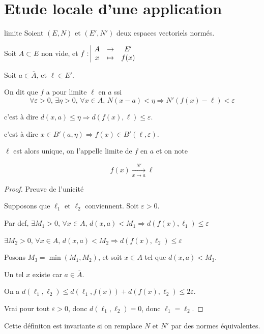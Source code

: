 \section{Etude locale d'une application}

\begin{definition}{limite}{}
    Soient $(E, N)$ et $(E', N')$ deux espaces vectoriels normés. 

    Soit $A \subset E$ non vide, et $f: \space \begin{array}{|ccc} \displaystyle A & \to & \displaystyle E' \\ \displaystyle x & \mapsto & \displaystyle f(x) \end{array}$

    Soit $a \in \overline A$, et $\ell \in E'$.

    On dit que $f$ a pour limite $\ell$ en $a$ ssi 
    $$\forall \varepsilon > 0, \, \exists \eta > 0, \, \forall x \in A, \, N(x - a) < \eta \Rightarrow N'(f(x) - \ell) < \varepsilon$$

    c'est à dire $d(x, a) \leqslant \eta \Rightarrow d(f(x), \ell) \leqslant \varepsilon$.

    c'est à dire $x \in B'(a, \eta) \Rightarrow f(x) \in B'(\ell, \varepsilon)$.

    $\ell$ est alors unique, on l'appelle limite de $f$ en $a$ et on note 

    $$f(x) \xrightarrow[x \to a ]{N'} \ell$$

\end{definition}


\begin{proof}
    Preuve de l'unicité 

    Supposons que $\ell_1$ et $\ell_2$ conviennent. Soit $\varepsilon > 0$.

    Par def, $\exists M_1 > 0, \, \forall x \in A, \, d(x, a) < M_1  \Rightarrow d(f(x), \ell_1) \leqslant \varepsilon$

    $\exists M_2 > 0, \, \forall x \in A, \, d(x, a) < M_2  \Rightarrow d(f(x), \ell_2) \leqslant \varepsilon$

    Posons $M_3 = \min(M_1, M_2)$, et soit $x \in A$ tel que $d(x, a) < M_3$.

    Un tel $x$ existe car $a \in \overline A$.

    On a $d(\ell_1, \ell_2) \leqslant d(\ell_1, f(x)) + d(f(x), \ell_2) \leqslant 2 \varepsilon$.

    Vrai pour tout $\varepsilon > 0$, donc $d(\ell_1, \ell_2) = 0$, donc $\ell_1 = \ell_2$.
\end{proof}

\begin{remarque}
    Cette définiton est invariante si on remplace $N$ et $N'$ par des normes équivalentes.
\end{remarque}

